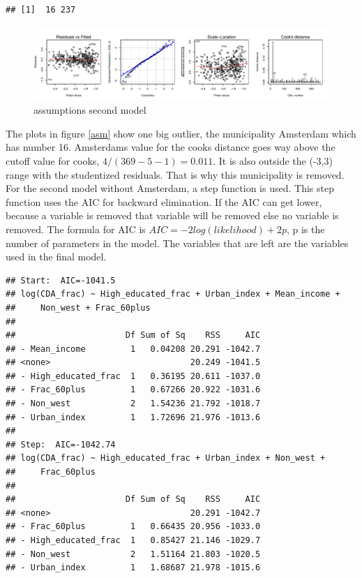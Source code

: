 \documentclass[11pt,]{article}
\begin{document}
\begin{verbatim}
## [1]  16 237
\end{verbatim}

\begin{figure}[H]

{\centering \includegraphics{lm_part_report_files/figure-latex/unnamed-chunk-3-1} 

}

\caption{\label{asm}assumptions second model}\label{fig:unnamed-chunk-3}
\end{figure}

The plots in figure \ref{asm} show one big outlier, the municipality
Amsterdam which has number 16. Amsterdams value for the cooks distance
goes way above the cutoff value for cooks, \(4/(369-5-1)=0.011\). It is
also outside the (-3,3) range with the studentized residuals. That is
why this municipality is removed.\\
For the second model without Amsterdam, a step function is used. This
step function uses the AIC for backward elimination. If the AIC can get
lower, because a variable is removed that variable will be removed else
no variable is removed. The formula for AIC is
\(AIC=-2log(likelihood)+2p\), p is the number of parameters in the
model. The variables that are left are the variables used in the final
model.

\begin{verbatim}
## Start:  AIC=-1041.5
## log(CDA_frac) ~ High_educated_frac + Urban_index + Mean_income + 
##     Non_west + Frac_60plus
## 
##                      Df Sum of Sq    RSS     AIC
## - Mean_income         1   0.04208 20.291 -1042.7
## <none>                            20.249 -1041.5
## - High_educated_frac  1   0.36195 20.611 -1037.0
## - Frac_60plus         1   0.67266 20.922 -1031.6
## - Non_west            2   1.54236 21.792 -1018.7
## - Urban_index         1   1.72696 21.976 -1013.6
## 
## Step:  AIC=-1042.74
## log(CDA_frac) ~ High_educated_frac + Urban_index + Non_west + 
##     Frac_60plus
## 
##                      Df Sum of Sq    RSS     AIC
## <none>                            20.291 -1042.7
## - Frac_60plus         1   0.66435 20.956 -1033.0
## - High_educated_frac  1   0.85427 21.146 -1029.7
## - Non_west            2   1.51164 21.803 -1020.5
## - Urban_index         1   1.68687 21.978 -1015.6
\end{verbatim}
\end{document}
